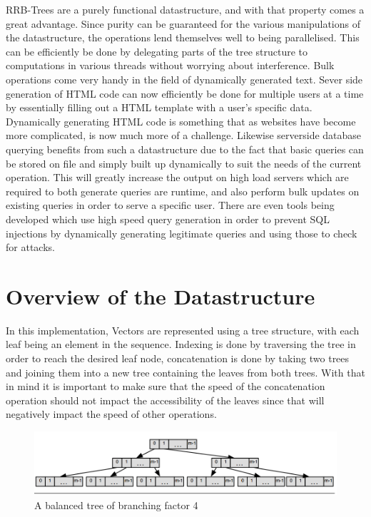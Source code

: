 \documentclass[11pt,a4paper,oneside]{article}
\begin{document}
RRB-Trees are a purely functional datastructure, and with that property comes a great advantage. Since purity can be guaranteed for the various manipulations of the datastructure, the operations lend themselves well to being parallelised. This can be efficiently be done by delegating parts of the tree structure to computations in various threads without worrying about interference. Bulk operations come very handy in the field of dynamically generated text\citep{blelloch1990vector}. Sever side generation of HTML code can now efficiently be done for multiple users at a time by essentially filling out a HTML template with a user's specific data. Dynamically generating HTML code is something that as websites have become more complicated, is now much more of a challenge\citep{hull2006balancing}. Likewise serverside database querying benefits from such a datastructure due to the fact that basic queries can be stored on file and simply built up dynamically to suit the needs of the current operation. This will greatly increase the output on high load servers which are required to both generate queries are runtime, and also perform bulk updates on existing queries in order to serve a specific user. There are even tools being developed which use high speed query generation in order to prevent SQL injections by dynamically generating legitimate queries and using those to check for attacks\citep{halfond2006}.


\section{Overview of the Datastructure}

In this implementation, Vectors are represented using a tree structure, with each leaf being an element in the sequence. Indexing is done by traversing the tree in order to reach the desired leaf node, concatenation is done by taking two trees and joining them into a new tree containing the leaves from both trees. With that in mind it is important to make sure that the speed of the concatenation operation should not impact the accessibility of the leaves since that will negatively impact the speed of other operations. 

\begin{figure}[h]
	\centering
	\includegraphics[scale=0.5]{img/radixbalancedtree.png}
	\caption{A balanced tree of branching factor 4\citep{bagwell2011rrb}}
\end{figure}
\end{document}
